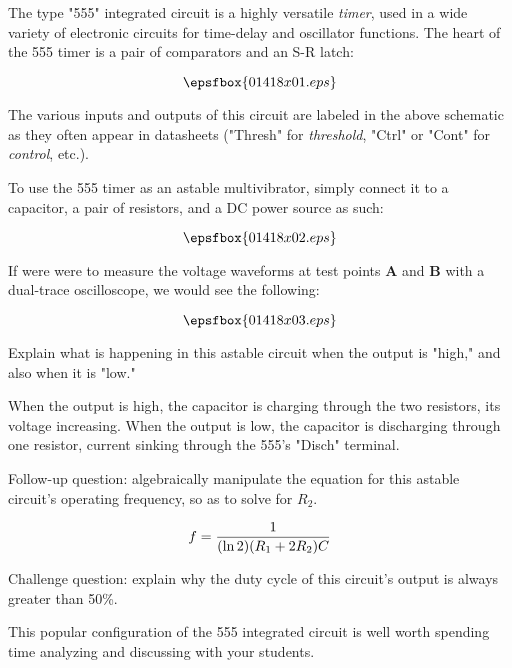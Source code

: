 

The type "555" integrated circuit is a highly versatile {\it timer}, used in a wide variety of electronic circuits for time-delay and oscillator functions.  The heart of the 555 timer is a pair of comparators and an S-R latch:

$$\epsfbox{01418x01.eps}$$

The various inputs and outputs of this circuit are labeled in the above schematic as they often appear in datasheets ("Thresh" for {\it threshold}, "Ctrl" or "Cont" for {\it control}, etc.).

To use the 555 timer as an astable multivibrator, simply connect it to a capacitor, a pair of resistors, and a DC power source as such:

$$\epsfbox{01418x02.eps}$$

If were were to measure the voltage waveforms at test points {\bf A} and {\bf B} with a dual-trace oscilloscope, we would see the following:

$$\epsfbox{01418x03.eps}$$

Explain what is happening in this astable circuit when the output is "high," and also when it is "low."







When the output is high, the capacitor is charging through the two resistors, its voltage increasing.  When the output is low, the capacitor is discharging through one resistor, current sinking through the 555's "Disch" terminal.

\vskip 10pt

Follow-up question: algebraically manipulate the equation for this astable circuit's operating frequency, so as to solve for $R_2$.

$$f = {1 \over {(\ln 2)(R_1 + 2R_2)C}}$$

\vskip 10pt

Challenge question: explain why the duty cycle of this circuit's output is always greater than 50\%.







This popular configuration of the 555 integrated circuit is well worth spending time analyzing and discussing with your students.




